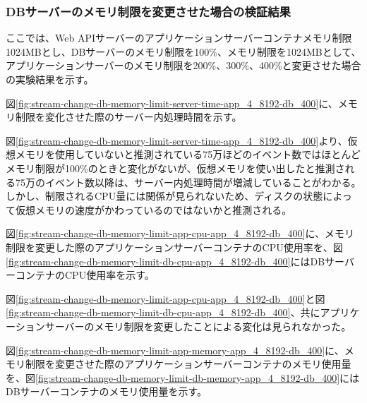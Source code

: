 \documentclass[../../../../main]{subfiles}
\begin{document}
    \subsubsection{DBサーバーのメモリ制限を変更させた場合の検証結果}\label{subsubsec:result-streaming-change-db-memory}

    ここでは、Web APIサーバーのアプリケーションサーバーコンテナメモリ制限1024MBとし、DBサーバーのメモリ制限を100\%、メモリ制限を1024MBとして、アプリケーションサーバーのメモリ制限を200\%、300\%、400\%と変更させた場合の実験結果を示す。


    図\ref{fig:stream-change-db-memory-limit-server-time-app_4_8192-db_400}に、メモリ制限を変化させた際のサーバー内処理時間を示す。

    

    図\ref{fig:stream-change-db-memory-limit-server-time-app_4_8192-db_400}より、仮想メモリを使用していないと推測されている75万ほどのイベント数ではほとんどメモリ制限が100\%のときと変化がないが、仮想メモリを使い出したと推測される75万のイベント数以降は、サーバー内処理時間が増減していることがわかる。しかし、制限されるCPU量には関係が見られないため、ディスクの状態によって仮想メモリの速度がかわっているのではないかと推測される。


    図\ref{fig:stream-change-db-memory-limit-app-cpu-app_4_8192-db_400}に、メモリ制限を変更した際のアプリケーションサーバーコンテナのCPU使用率を、図\ref{fig:stream-change-db-memory-limit-db-cpu-app_4_8192-db_400}にはDBサーバーコンテナのCPU使用率を示す。

    

    

    図\ref{fig:stream-change-db-memory-limit-app-cpu-app_4_8192-db_400}と図\ref{fig:stream-change-db-memory-limit-db-cpu-app_4_8192-db_400}、共にアプリケーションサーバーのメモリ制限を変更したことによる変化は見られなかった。


    図\ref{fig:stream-change-db-memory-limit-app-memory-app_4_8192-db_400}に、メモリ制限を変更させた際のアプリケーションサーバーコンテナのメモリ使用量を、図\ref{fig:stream-change-db-memory-limit-db-memory-app_4_8192-db_400}にはDBサーバーコンテナのメモリ使用量を示す。
\end{document}

